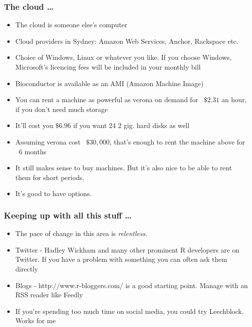 \documentclass{beamer}
\begin{document}
\begin{frame}
\frametitle{The cloud \ldots}
\begin{itemize}
\item The cloud is someone else's computer
\item Cloud providers in Sydney: Amazon Web Services, Anchor, Rackspace etc.
\item Choice of Windows, Linux or whatever you like. If you choose Windows, Microsoft's 
			licencing fees will be included in your monthly bill
\item Bioconductor is available as an AMI (Amazon Machine Image)
\item You can rent a machine as powerful as verona on demand for ~$\$2.31$ an hour, if you 
			don't need much storage
\item It'll cost you $\$6.96$ if you want 24 2 gig. hard disks as well
\item Assuming verona cost ~$\$30,000$, that's enough to rent the machine above for ~6 months
\item It still makes sense to buy machines. But it's also nice to be able to rent them for
			short periods.
\item It's good to have options.
\end{itemize}
\end{frame}

\begin{frame}
\frametitle{Keeping up with all this stuff \ldots}
\begin{itemize}
\item The pace of change in this area is \emph{relentless}.
\item Twitter - Hadley Wickham and many other prominent R developers are on Twitter. If you 
			have a problem with something you can often ask them directly
\item Blogs - http://www.r-bloggers.com/ is a good starting point. Manage with an RSS reader 				like Feedly
\item If you're spending too much time on social media, you could try Leechblock.
			Works for me
\end{itemize}
\end{frame}
\end{document}
